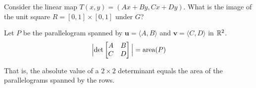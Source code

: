  













\begin{example}
    Consider the linear map $T(x,y) = (Ax + By, Cx + Dy)$.  What is the image of the unit square $R = [0,1] \times [0,1]$ under $G$?
    \end{example}

\begin{proposition}
    Let $P$ be the parallelogram spanned by $\bm{u} = \langle A, B \rangle$ and $\bm{v} = \langle C, D \rangle$ in $\mathbb{R}^2$.
    \begin{equation*}
        \Big|\textnormal{det}\begin{bmatrix}
A & B \\
C & D
\end{bmatrix}\Big| = \textnormal{area}(P)
    \end{equation*}
    
       That is, the absolute value of a $2 \times 2$
determinant equals the area of the parallelograms spanned by the rows.
    \end{proposition}


